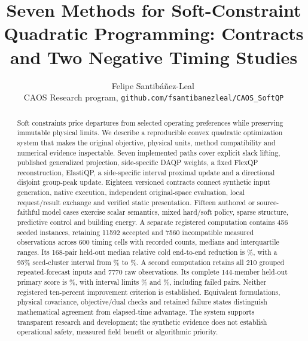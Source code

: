 \documentclass[11pt]{article}
\title{Seven Methods for Soft-Constraint Quadratic Programming: Contracts and Two Negative Timing Studies}
\author{Felipe Santib\'a\~nez-Leal\,\orcidlink{0000-0002-0150-3246}\\
\small CAOS Research program, \texttt{github.com/fsantibanezleal/CAOS\_SoftQP}}
\date{\docdate}
\begin{document}
\maketitle
\thispagestyle{plain}
\headerblock
\begin{abstract}
Soft constraints price departures from selected operating preferences while
preserving immutable physical limits. We describe a reproducible convex quadratic
optimization system that makes the original objective, physical units, method
compatibility and numerical evidence inspectable. Seven implemented paths cover
explicit slack lifting, published generalized projection, side-specific DAQP
weights, a fixed FlexQP reconstruction, ElastiQP, a side-specific interval
proximal update and a directional disjoint group-peak update. Eighteen versioned
contracts connect synthetic input generation, native execution, independent
original-space evaluation, local request/result exchange and verified static
presentation. Fifteen authored or source-faithful model cases exercise scalar
semantics, mixed hard/soft policy, sparse structure, predictive control and
building energy. A separate registered computation contains 456 seeded instances,
retaining 11592 accepted and 7560 incompatible measured observations across
600 timing cells with recorded counts, medians and interquartile ranges. Its
168-pair held-out median relative cold end-to-end reduction is
\OriginalEstimate\%, with a 95\% seed-cluster interval from \OriginalLower\%
to \OriginalUpper\%. A second computation retains all 210 grouped
repeated-forecast inputs and 7770 raw observations. Its complete 144-member held-out
primary score is \PrimaryEstimate\%, with interval limits \PrimaryLower\%
and \PrimaryUpper\%, including \PrimaryFailed{} failed pairs. Neither
registered ten-percent improvement criterion is established. Equivalent
formulations, physical covariance, objective/dual checks and retained failure
states distinguish mathematical agreement from elapsed-time advantage. The
system supports transparent research and development; the synthetic evidence
does not establish operational safety, measured field benefit or algorithmic priority.
\end{abstract}

















\end{document}
